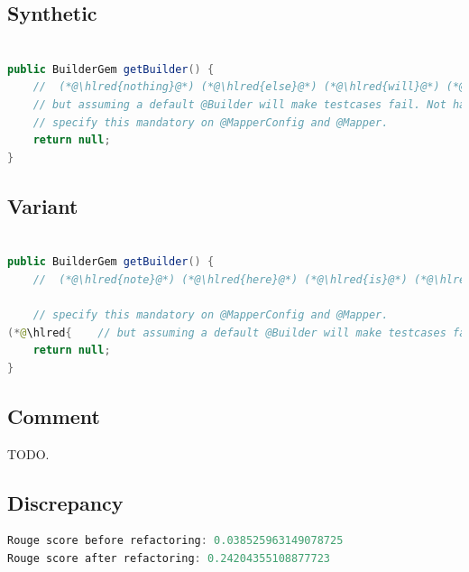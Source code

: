 \documentclass[usenames,dvipsnames]{article} %
\DeclareRobustCommand{\hlred}[1]{{\sethlcolor{pink}\hl{#1}}}
\begin{document}
  \subsection{Synthetic}

  \begin{lstlisting}[language=java]

public BuilderGem getBuilder() {
    //  (*@\hlred{nothing}@*) (*@\hlred{else}@*) (*@\hlred{will}@*) (*@\hlred{do}@*) it (*@\hlred{automatically}@*)
    // but assuming a default @Builder will make testcases fail. Not having a default means that you need to
    // specify this mandatory on @MapperConfig and @Mapper.
    return null;
}
  \end{lstlisting}

  \subsection{Variant}

  \begin{lstlisting}[language=java]

public BuilderGem getBuilder() {
    //  (*@\hlred{note}@*) (*@\hlred{here}@*) (*@\hlred{is}@*) (*@\hlred{that}@*) (*@\hlred{developers}@*) (*@\hlred{could}@*) (*@\hlred{instead}@*) (*@\hlred{have}@*) (*@\hlred{more}@*) (*@\hlred{information}@*) (*@\hlred{that}@*) (*@\hlred{should}@*) (*@\hlred{not}@*) (*@\hlred{need}@*) (*@\hlred{builder}@*) (*@\hlred{information}@*) (*@\hlred{and}@*) (*@\hlred{should}@*) (*@\hlred{also}@*)

    // specify this mandatory on @MapperConfig and @Mapper.
(*@\hlred{    // but assuming a default @Builder will make testcases fail. Not having a default means that you need to}@*)
    return null;
}
  \end{lstlisting}

  \subsection{Comment}

  TODO.

  \subsection{Discrepancy}

  \begin{lstlisting}[language=java]
Rouge score before refactoring: 0.038525963149078725
Rouge score after refactoring: 0.24204355108877723
  \end{lstlisting}
\end{document}
